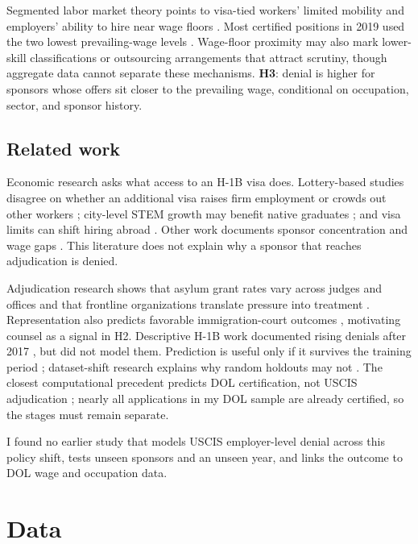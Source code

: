 \documentclass[9pt,twoside]{pnas-new}
\begin{document}
Segmented labor market theory points to visa-tied workers' limited mobility and employers' ability to hire near wage floors \cite{piore1979}. Most certified positions in 2019 used the two lowest prevailing-wage levels \cite{costahira2020}. Wage-floor proximity may also mark lower-skill classifications or outsourcing arrangements that attract scrutiny, though aggregate data cannot separate these mechanisms. \textbf{H3}: denial is higher for sponsors whose offers sit closer to the prevailing wage, conditional on occupation, sector, and sponsor history.

\subsection*{Related work}

Economic research asks what access to an H-1B visa does. Lottery-based studies disagree on whether an additional visa raises firm employment or crowds out other workers \cite{doran2022,mahajan2025}; city-level STEM growth may benefit native graduates \cite{peri2015}; and visa limits can shift hiring abroad \cite{glennon2024}. Other work documents sponsor concentration and wage gaps \cite{mayda2020,borjas2026,bourveau2025}. This literature does not explain why a sponsor that reaches adjudication is denied.

Adjudication research shows that asylum grant rates vary across judges and offices \cite{ramjinogales2007} and that frontline organizations translate pressure into treatment \cite{brodkin2011}. Representation also predicts favorable immigration-court outcomes \cite{eaglyshafer2015}, motivating counsel as a signal in H2. Descriptive H-1B work documented rising denials after 2017 \cite{nfap2020}, but did not model them. Prediction is useful only if it survives the training period \cite{kleinberg2015}; dataset-shift research explains why random holdouts may not \cite{quinonero2009}. The closest computational precedent predicts DOL certification, not USCIS adjudication \cite{keqiao2021}; nearly all applications in my DOL sample are already certified, so the stages must remain separate.

I found no earlier study that models USCIS employer-level denial across this policy shift, tests unseen sponsors and an unseen year, and links the outcome to DOL wage and occupation data.

\section*{Data}
\end{document}
